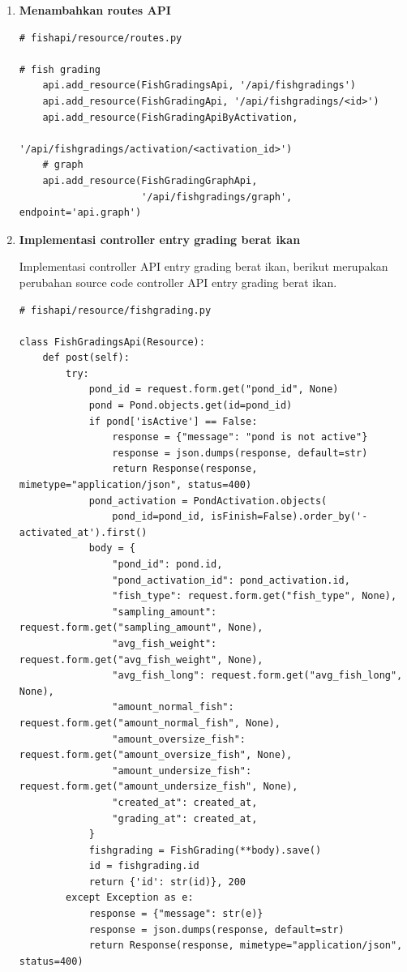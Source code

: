 \begin{enumerate}[1.]
\item \textbf{Menambahkan routes API}

\begin{lstlisting}
# fishapi/resource/routes.py

# fish grading
    api.add_resource(FishGradingsApi, '/api/fishgradings')
    api.add_resource(FishGradingApi, '/api/fishgradings/<id>')
    api.add_resource(FishGradingApiByActivation,
                     '/api/fishgradings/activation/<activation_id>')
    # graph
    api.add_resource(FishGradingGraphApi,
                     '/api/fishgradings/graph', endpoint='api.graph')
\end{lstlisting}




\item \textbf{Implementasi controller entry grading berat ikan}

Implementasi controller API entry grading berat ikan, berikut merupakan perubahan source code controller API entry grading berat ikan.

\begin{lstlisting}
# fishapi/resource/fishgrading.py

class FishGradingsApi(Resource):
    def post(self):
        try:
            pond_id = request.form.get("pond_id", None)
            pond = Pond.objects.get(id=pond_id)
            if pond['isActive'] == False:
                response = {"message": "pond is not active"}
                response = json.dumps(response, default=str)
                return Response(response, mimetype="application/json", status=400)
            pond_activation = PondActivation.objects(
                pond_id=pond_id, isFinish=False).order_by('-activated_at').first()
            body = {
                "pond_id": pond.id,
                "pond_activation_id": pond_activation.id,
                "fish_type": request.form.get("fish_type", None),
                "sampling_amount": request.form.get("sampling_amount", None),
                "avg_fish_weight": request.form.get("avg_fish_weight", None),
                "avg_fish_long": request.form.get("avg_fish_long", None),
                "amount_normal_fish": request.form.get("amount_normal_fish", None),
                "amount_oversize_fish": request.form.get("amount_oversize_fish", None),
                "amount_undersize_fish": request.form.get("amount_undersize_fish", None),
                "created_at": created_at,
                "grading_at": created_at,
            }
            fishgrading = FishGrading(**body).save()
            id = fishgrading.id
            return {'id': str(id)}, 200
        except Exception as e:
            response = {"message": str(e)}
            response = json.dumps(response, default=str)
            return Response(response, mimetype="application/json", status=400)
\end{lstlisting}


\end{enumerate}
